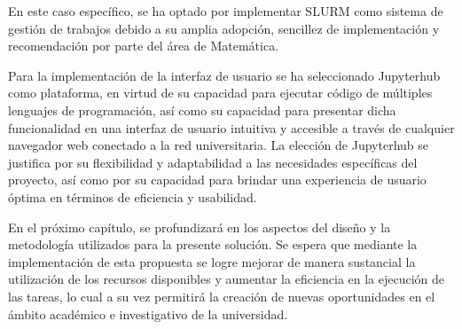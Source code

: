 \begin{doublespace}
\begin{multicols}{2}
En este caso específico, se ha optado por implementar SLURM como sistema de gestión de trabajos debido a su amplia adopción, sencillez de implementación y recomendación por parte del área de Matemática.

Para la implementación de la interfaz de usuario se ha seleccionado Jupyterhub como plataforma, en virtud de su capacidad para ejecutar código de múltiples lenguajes de programación, así como su capacidad para presentar dicha funcionalidad en una interfaz de usuario intuitiva y accesible a través de cualquier navegador web conectado a la red universitaria. La elección de Jupyterhub se justifica por su flexibilidad y adaptabilidad a las necesidades específicas del proyecto, así como por su capacidad para brindar una experiencia de usuario óptima en términos de eficiencia y usabilidad.

En el próximo capítulo, se profundizará en los aspectos del diseño y la metodología utilizados para la presente solución. Se espera que mediante la implementación de esta propuesta se logre mejorar de manera sustancial la utilización de los recursos disponibles y aumentar la eficiencia en la ejecución de las tareas, lo cual a su vez permitirá la creación de nuevas oportunidades en el ámbito académico e investigativo de la universidad.
\end{multicols}

\mylinespacing
\mylinespacing
\begin{tightcenter}
\end{tightcenter}
\end{doublespace}
